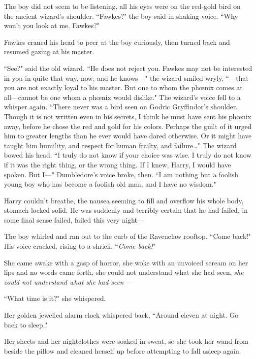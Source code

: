 The boy did not seem to be listening, all his eyes were on the red-gold bird on the ancient wizard's shoulder. ``Fawkes?" the boy said in shaking voice. ``Why won't you look at me, Fawkes?"

Fawkes craned his head to peer at the boy curiously, then turned back and resumed gazing at his master.

``See?" said the old wizard. ``He does not reject you. Fawkes may not be interested in you in quite that way, now; and he knows---" the wizard smiled wryly, ``---that you are not exactly loyal to his master. But one to whom the phœnix comes at all---cannot be one whom a phœnix would dislike." The wizard's voice fell to a whisper again. ``There never was a bird seen on Godric Gryffindor's shoulder. Though it is not written even in his secrets, I think he must have sent his phœnix away, before he chose the red and gold for his colors. Perhaps the guilt of it urged him to greater lengths than he ever would have dared otherwise. Or it might have taught him humility, and respect for human frailty, and failure{\ldots}" The wizard bowed his head. ``I truly do not know if your choice was wise. I truly do not know if it was the right thing, or the wrong thing. If I knew, Harry, I would have spoken. But I---" Dumbledore's voice broke, then. ``I am nothing but a foolish young boy who has become a foolish old man, and I have no wisdom."

Harry couldn't breathe, the nausea seeming to fill and overflow his whole body, stomach locked solid. He was suddenly and terribly certain that he had failed, in some final sense failed, failed this very night---

The boy whirled and ran out to the curb of the Ravenclaw rooftop. ``Come back!" His voice cracked, rising to a shriek. ``\emph{Come back!}"


She came awake with a gasp of horror, she woke with an unvoiced scream on her lips and no words came forth, she could not understand what she had seen, \emph{she could not understand what she had seen}---

``What time is it?" she whispered.

Her golden jewelled alarm clock whispered back, ``Around eleven at night. Go back to sleep."

Her sheets and her nightclothes were soaked in sweat, so she took her wand from beside the pillow and cleaned herself up before attempting to fall asleep again.

